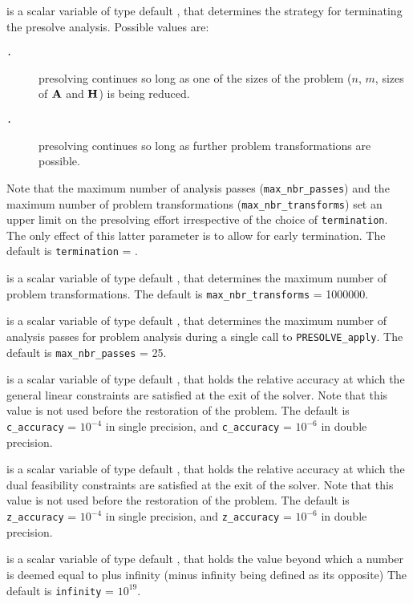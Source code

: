 \documentclass{galahad}
\newcommand{\packagename}{PRESOLVE}
\newcommand{\sym}{\tt\small}
\begin{document}
\begin{description}
 is a scalar variable of type default \integer, that
determines the strategy for terminating the presolve analysis.
Possible values are:
\begin{description}
\item[\sym \galsymreducedsize.]  presolving continues so long as one of
            the sizes of the problem ($n$, $m$, sizes of ${\mathbf{A}}$ and ${\mathbf{H}}$) is
            being reduced.
\item[\sym \galsymfullpresolve.] presolving continues so long as further
            problem transformations are possible.
\end{description}
Note that the maximum number of analysis passes ({\tt max\_nbr\_passes})  and
the maximum number of problem transformations ({\tt max\_nbr\_transforms})
set an upper limit on the  presolving effort irrespective of the choice of
{\tt termination}. The only effect of this latter parameter is to allow for
early termination.
The default is {\tt termination} = {\sym \galsymreducedsize}.

 is a scalar variable of type default \integer, that
determines the maximum number of problem transformations.
The default is {\tt max\_nbr\_transforms} = 1000000.

 is a scalar variable of type default \integer, that
determines the maximum number of analysis passes for problem analysis
during a single call to {\tt \packagename\_apply}.
The default is {\tt max\_nbr\_passes} = 25.

 is a scalar variable of type default \realdp, that holds the
relative accuracy at which the general linear constraints are satisfied at
the exit of the solver. Note that this value is not used before the restoration
of the problem.
The default is {\tt c\_accuracy} = $10^{-4}$ in single precision, and
{\tt c\_accuracy} = $10^{-6}$ in double precision.

 is a scalar variable of type default \realdp, that holds the
relative accuracy at which the dual feasibility constraints are satisfied at
the exit of the solver. Note that this value is not used before the restoration
of the problem.
The default is {\tt z\_accuracy} = $10^{-4}$ in single precision, and
{\tt z\_accuracy} = $10^{-6}$ in double precision.

 is a scalar variable of type default \realdp, that holds the
value beyond which a number is deemed equal to plus infinity
(minus infinity being defined as its opposite)
The default is {\tt infinity} = $10^{19}$.


\end{description}
\end{document}
